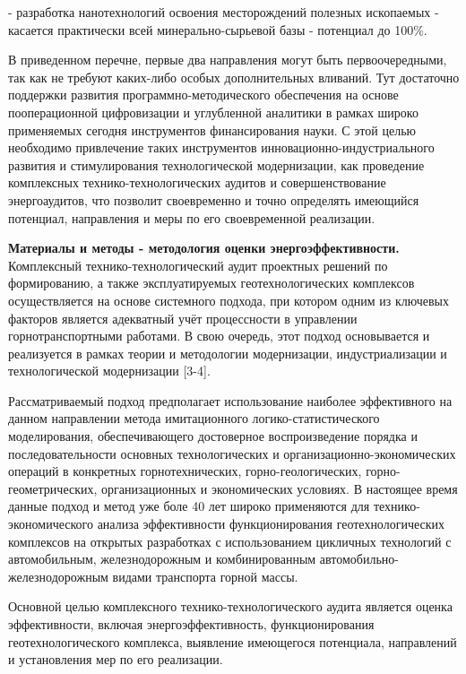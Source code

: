 \begin{multicols}{2}
- разработка нанотехнологий освоения месторождений полезных ископаемых
- касается практически всей минерально-сырьевой базы - потенциал до
100\%.

В приведенном перечне, первые два направления могут быть
первоочередными, так как не требуют каких-либо особых дополнительных
вливаний. Тут достаточно поддержки развития программно-методического
обеспечения на основе пооперационной цифровизации и углубленной
аналитики в рамках широко применяемых сегодня инструментов
финансирования науки. С этой целью необходимо привлечение таких
инструментов инновационно-индустриального развития и стимулирования
технологической модернизации, как проведение комплексных
технико-технологических аудитов и совершенствование энергоаудитов, что
позволит своевременно и точно определять имеющийся потенциал,
направления и меры по его своевременной реализации.

{\bfseries Материалы и методы - методология оценки энергоэффективности.}
Комплексный технико-технологический аудит проектных решений по
формированию, а также эксплуатируемых геотехнологических комплексов
осуществляется на основе системного подхода, при котором одним из
ключевых факторов является адекватный учёт процессности в управлении
горнотранспортными работами. В свою очередь, этот подход основывается и
реализуется в рамках теории и методологии модернизации, индустриализации
и технологической модернизации {[}3-4{]}.

Рассматриваемый подход предполагает использование наиболее эффективного
на данном направлении метода имитационного логико-статистического
моделирования, обеспечивающего достоверное воспроизведение порядка и
последовательности основных технологических и
организационно-экономических операций в конкретных горнотехнических,
горно-геологических, горно-геометрических, организационных и
экономических условиях. В настоящее время данные подход и метод уже боле
40 лет широко применяются для технико-экономического анализа
эффективности функционирования геотехнологических комплексов на открытых
разработках с использованием цикличных технологий с автомобильным,
железнодорожным и комбинированным автомобильно-железнодорожным видами
транспорта горной массы.

Основной целью комплексного технико-технологического аудита является
оценка эффективности, включая энергоэффективность, функционирования
геотехнологического комплекса, выявление имеющегося потенциала,
направлений и установления мер по его реализации.


\end{multicols}
